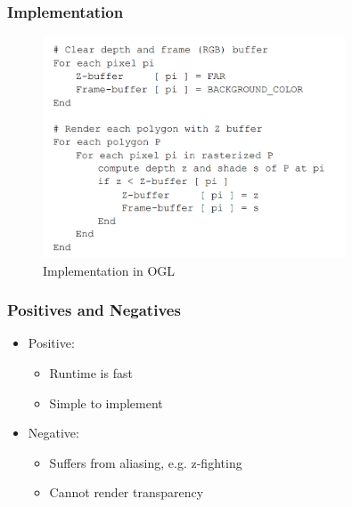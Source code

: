 \documentclass[11pt]{article}
\begin{document}
\subsubsection*{Implementation}
\begin{figure}[h]
    \centering
    \includegraphics[width=0.8\textwidth]{z_buff_implem.png}
    \caption{Implementation in OGL}
    \label{fig:implem_z_buff}
\end{figure}


\subsubsection*{Positives and Negatives}
\begin{itemize}
    \item Positive: \begin{itemize}
        \item Runtime is fast
        \item Simple to implement
    \end{itemize}
    \item Negative: \begin{itemize}
        \item Suffers from aliasing, e.g. z-fighting
        \item Cannot render transparency
    \end{itemize}
    
    
\end{itemize}
\end{document}
